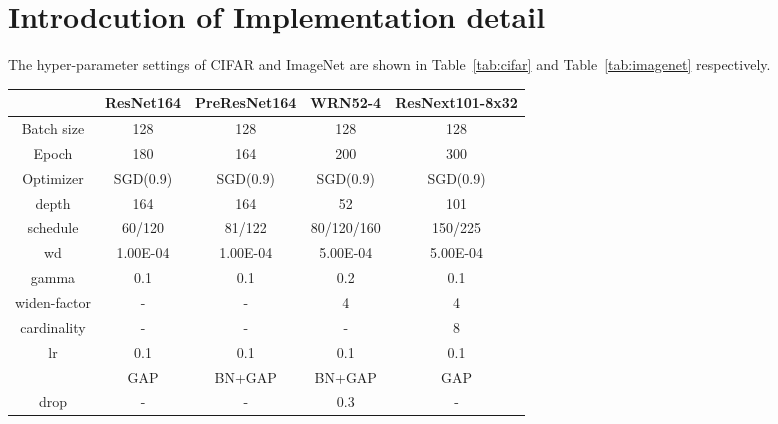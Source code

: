 \documentclass[letterpaper]{article} \usepackage{aaai20}  \usepackage{times}  \usepackage{helvet} \usepackage{courier}  \usepackage[hyphens]{url}  \usepackage{graphicx} \urlstyle{rm} \def\UrlFont{\rm}  \usepackage{graphicx}  \frenchspacing  \setlength{\pdfpagewidth}{8.5in}  \setlength{\pdfpageheight}{11in}  \usepackage{color}
\begin{document}
	\appendix
	\section{Introdcution of Implementation detail}
	The hyper-parameter settings of  CIFAR and ImageNet are shown in Table~\ref{tab:cifar} and Table~\ref{tab:imagenet} respectively. 
	\begin{table*}[htbp]
		\small
		\centering
		\begin{tabular}{|c|c|c|c|c|}
			\toprule
			& ResNet164 & PreResNet164 & WRN52-4 & ResNext101-8x32 \\
			\midrule
			Batch size & 128   & 128   & 128   & 128 \\
			Epoch & 180   & 164   & 200   & 300 \\
			Optimizer & SGD(0.9) & SGD(0.9) & SGD(0.9) & SGD(0.9) \\
			depth & 164   & 164   & 52    & 101 \\
			schedule & 60/120 & 81/122 & 80/120/160 & 150/225 \\
			wd    & 1.00E-04 & 1.00E-04 & 5.00E-04 & 5.00E-04 \\
			gamma & 0.1   & 0.1   & 0.2   & 0.1 \\
			widen-factor & -     & -     & 4     & 4 \\
			cardinality & -     & -     & -     & 8 \\
			lr    & 0.1   & 0.1   & 0.1   & 0.1 \\
			 & GAP   & BN+GAP & BN+GAP & GAP \\
			drop  & -     & -     & 0.3   & - \\
			\bottomrule
		\end{tabular}\caption{Implementation detail for \textbf{CIFAR10/100} image classification. Normalization and standard data augmentation (random cropping and horizontal flipping) are applied to the training data. GAP and BN denote Global Average Pooling and Batch Normalization separately. }
		\label{tab:cifar}\vspace{-0.2cm}
	\end{table*}
\end{document}
